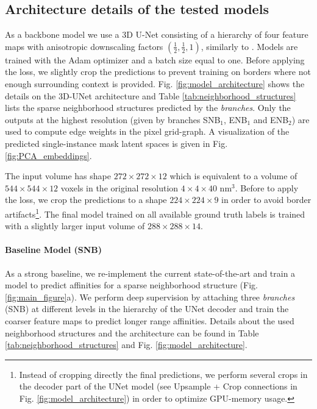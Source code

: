 \subsection{Architecture details of the tested models}\label{sec:models_details}
As a backbone model we use a 3D U-Net consisting of a hierarchy of four feature maps with anisotropic downscaling factors $(\frac{1}{2},\frac{1}{2},1)$, similarly to \cite{lee2019learning,lee2017superhuman,wolf2018mutex}. 
Models are trained with the Adam optimizer and a batch size equal to one. Before applying the loss, we slightly crop the predictions to prevent training on borders where not enough surrounding context is provided. 
Fig. \ref{fig:model_architecture} shows the details on the 3D-UNet architecture and Table \ref{tab:neighborhood_structures} lists the sparse neighborhood structures predicted by the \emph{\sparseBr branches}. Only the outputs at the highest resolution (given by branches SNB$_1$, ENB$_1$ and ENB$_2$) are used to compute edge weights in the pixel grid-graph. A visualization of the predicted single-instance mask latent spaces is given in Fig. \ref{fig:PCA_embeddings}.

The input volume has shape $272 \times 272\times12$ which is equivalent to a volume of $544\times 544\times 12$ voxels in the original resolution $4\times 4\times 40$ nm$^3$. Before to apply the loss, we crop the predictions to a shape $224\times 224\times 9$ in order to avoid border artifacts\footnote{Instead of cropping directly the final predictions, we perform several crops in the decoder part of the UNet model (see Upsample + Crop connections in Fig. \ref{fig:model_architecture}) in order to optimize GPU-memory usage.}.
The final model trained on all available ground truth labels is trained with a slightly larger input volume of $288\times 288\times 14$.

 
\paragraph{Baseline Model (SNB)} As a strong baseline, we re-implement the current state-of-the-art and train a model to predict affinities for a sparse neighborhood structure (Fig. \ref{fig:main_figure}a). We perform deep supervision by attaching three \emph{\sparseBr branches} (SNB) at different levels in the hierarchy of the UNet decoder and train the coarser feature maps to predict longer range affinities. Details about the used neighborhood structures and the architecture can be found in Table \ref{tab:neighborhood_structures} and Fig. \ref{fig:model_architecture}.

